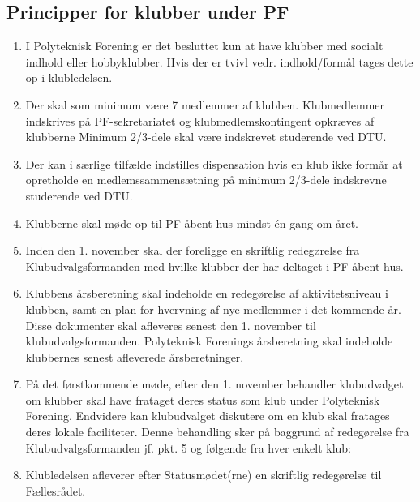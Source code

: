 \subsection{Principper for klubber under PF}
\begin{enumerate}
\item I Polyteknisk Forening er det besluttet kun at have klubber med socialt indhold eller hobbyklubber. Hvis der er
tvivl vedr. indhold/formål tages dette op i klubledelsen.
\item Der skal som minimum være 7 medlemmer af klubben. Klubmedlemmer indskrives på PF-sekretariatet og
klubmedlemskontingent opkræves af klubberne Minimum 2/3-dele skal være indskrevet studerende ved DTU.
\item Der kan i særlige tilfælde indstilles dispensation hvis en klub ikke formår at opretholde en
medlemssammensætning på minimum 2/3-dele indskrevne studerende ved DTU.
\item Klubberne skal møde op til PF åbent hus mindst én gang om året.
\item Inden den 1. november skal der foreligge en skriftlig redegørelse fra Klubudvalgsformanden med hvilke
klubber der har deltaget i PF åbent hus.
\item Klubbens årsberetning skal indeholde en redegørelse af aktivitetsniveau i klubben, samt en plan for hvervning
af nye medlemmer i det kommende år. Disse dokumenter skal afleveres senest den 1. november til
klubudvalgsformanden. Polyteknisk Forenings årsberetning skal indeholde klubbernes senest afleverede
årsberetninger.
\item På det førstkommende møde, efter den 1. november behandler klubudvalget om klubber skal have frataget deres status som klub under Polyteknisk Forening. Endvidere kan klubudvalget diskutere om en klub skal fratages deres lokale faciliteter. Denne behandling sker på baggrund af redegørelse fra Klubudvalgsformanden jf. pkt. 5 og følgende fra hver enkelt klub:
\item Klubledelsen afleverer efter Statusmødet(rne) en skriftlig redegørelse til Fællesrådet.
\end{enumerate}

